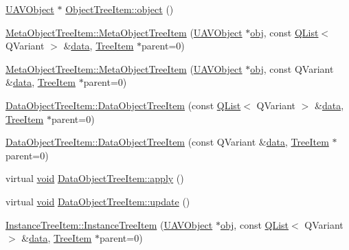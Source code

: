 \begin{DoxyCompactItemize}
\item 
\hyperlink{class_u_a_v_object}{U\-A\-V\-Object} $\ast$ \hyperlink{group___u_a_v_object_browser_plugin_gac539f66530cd71a2b0b562cb5e2accc7}{Object\-Tree\-Item\-::object} ()
\item 
\hyperlink{group___u_a_v_object_browser_plugin_gaccbd935f55017692b1051678b5f53ad8}{Meta\-Object\-Tree\-Item\-::\-Meta\-Object\-Tree\-Item} (\hyperlink{class_u_a_v_object}{U\-A\-V\-Object} $\ast$\hyperlink{glext_8h_a0c0d4701a6c89f4f7f0640715d27ab26}{obj}, const \hyperlink{class_q_list}{Q\-List}$<$ Q\-Variant $>$ \&\hyperlink{glext_8h_a8850df0785e6fbcc2351af3b686b8c7a}{data}, \hyperlink{class_tree_item}{Tree\-Item} $\ast$parent=0)
\item 
\hyperlink{group___u_a_v_object_browser_plugin_ga13e8806399befff9a6db4becc66810d7}{Meta\-Object\-Tree\-Item\-::\-Meta\-Object\-Tree\-Item} (\hyperlink{class_u_a_v_object}{U\-A\-V\-Object} $\ast$\hyperlink{glext_8h_a0c0d4701a6c89f4f7f0640715d27ab26}{obj}, const Q\-Variant \&\hyperlink{glext_8h_a8850df0785e6fbcc2351af3b686b8c7a}{data}, \hyperlink{class_tree_item}{Tree\-Item} $\ast$parent=0)
\item 
\hyperlink{group___u_a_v_object_browser_plugin_gabc056eda5e72e5f0bebe3fd41fd5f552}{Data\-Object\-Tree\-Item\-::\-Data\-Object\-Tree\-Item} (const \hyperlink{class_q_list}{Q\-List}$<$ Q\-Variant $>$ \&\hyperlink{glext_8h_a8850df0785e6fbcc2351af3b686b8c7a}{data}, \hyperlink{class_tree_item}{Tree\-Item} $\ast$parent=0)
\item 
\hyperlink{group___u_a_v_object_browser_plugin_ga1a938e6bed78334aef5b0a9c4050e847}{Data\-Object\-Tree\-Item\-::\-Data\-Object\-Tree\-Item} (const Q\-Variant \&\hyperlink{glext_8h_a8850df0785e6fbcc2351af3b686b8c7a}{data}, \hyperlink{class_tree_item}{Tree\-Item} $\ast$parent=0)
\item 
virtual \hyperlink{group___u_a_v_objects_plugin_ga444cf2ff3f0ecbe028adce838d373f5c}{void} \hyperlink{group___u_a_v_object_browser_plugin_gab322316ea60cf5981a289051b8d486b3}{Data\-Object\-Tree\-Item\-::apply} ()
\item 
virtual \hyperlink{group___u_a_v_objects_plugin_ga444cf2ff3f0ecbe028adce838d373f5c}{void} \hyperlink{group___u_a_v_object_browser_plugin_ga758265673ec0372a0dbb0ccd04d957d2}{Data\-Object\-Tree\-Item\-::update} ()
\item 
\hyperlink{group___u_a_v_object_browser_plugin_gabd66635c3e24281e23eada197638556f}{Instance\-Tree\-Item\-::\-Instance\-Tree\-Item} (\hyperlink{class_u_a_v_object}{U\-A\-V\-Object} $\ast$\hyperlink{glext_8h_a0c0d4701a6c89f4f7f0640715d27ab26}{obj}, const \hyperlink{class_q_list}{Q\-List}$<$ Q\-Variant $>$ \&\hyperlink{glext_8h_a8850df0785e6fbcc2351af3b686b8c7a}{data}, \hyperlink{class_tree_item}{Tree\-Item} $\ast$parent=0)

\end{DoxyCompactItemize}
